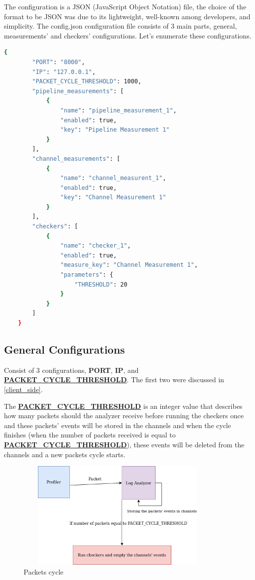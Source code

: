 The configuration is a JSON (JavaScript Object Notation) file,
the choice of the format to be JSON was due to its
lightweight, well-known among developers, and simplicity. 
The config.json configuration file consists of 3 main parts, 
general, measurements' and checkers' configurations. Let's enumerate these configurations.
\newline
\begin{lstlisting}[language=bash, caption={Sample configuration},captionpos=b, label={lst:sample_confing}]
	{
		"PORT": "8000",
		"IP": "127.0.0.1",
		"PACKET_CYCLE_THRESHOLD": 1000,
		"pipeline_measurements": [
			{
				"name": "pipeline_measurement_1",
				"enabled": true,
				"key": "Pipeline Measurement 1"
			}
		],
		"channel_measurements": [
			{
				"name": "channel_measurent_1",
				"enabled": true,
				"key": "Channel Measurement 1"
			}
		],
		"checkers": [
			{
				"name": "checker_1",
				"enabled": true,
				"measure_key": "Channel Measurement 1",
				"parameters": {
					"THRESHOLD": 20
				}
			}
		]
	}
\end{lstlisting}

\subsection{General Configurations} \label{sec:g_config}
Consist of 3 configurations, \textbf{PORT}, \textbf{IP}, 
and \textbf{\url{PACKET_CYCLE_THRESHOLD}}. The first two were discussed in \ref{client_side}.

The \textbf{\url{PACKET_CYCLE_THRESHOLD}} is an integer value that describes
how many packets should the analyzer receive before running the checkers once
and these packets' events will be stored in the channels and when the cycle
finishes (when the number of packets received is equal to \textbf{\url{PACKET_CYCLE_THRESHOLD}}), these
events will be deleted from the channels and a new packets cycle starts.
\newline
\begin{figure}[H]
	\centering
	\includegraphics[width=0.9\textwidth,height=200px]{images/packets_cycle.png}
	\caption{Packets cycle}
	\label{fig:packets_cycle}
\end{figure}

